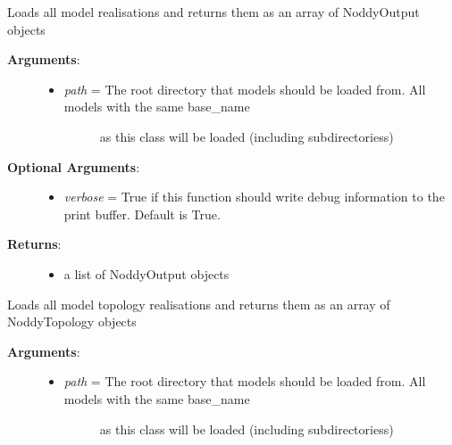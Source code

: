 \documentclass[a4paper,10pt,english]{sphinxmanual}
\begin{document}
\begin{fulllineitems}
\begin{fulllineitems}
\label{pynoddy:pynoddy.experiment.MonteCarlo.MonteCarlo.load_noddy_realisations}
Loads all model realisations and returns them as an array of NoddyOutput objects
\begin{description}
\item[{\textbf{Arguments}:}] \leavevmode\begin{itemize}
\item {} \begin{description}
\item[{\emph{path} = The root directory that models should be loaded from. All models with the same base\_name}] \leavevmode
as this class will be loaded (including subdirectoriess)

\end{description}

\end{itemize}

\item[{\textbf{Optional Arguments}:}] \leavevmode\begin{itemize}
\item {} 
\emph{verbose} = True if this function should write debug information to the print buffer. Default is True.

\end{itemize}

\item[{\textbf{Returns}:}] \leavevmode\begin{itemize}
\item {} 
a list of NoddyOutput objects

\end{itemize}

\end{description}

\end{fulllineitems}


\begin{fulllineitems}
\label{pynoddy:pynoddy.experiment.MonteCarlo.MonteCarlo.load_topology_realisations}
Loads all model topology realisations and returns them as an array of NoddyTopology objects
\begin{description}
\item[{\textbf{Arguments}:}] \leavevmode\begin{itemize}
\item {} \begin{description}
\item[{\emph{path} = The root directory that models should be loaded from. All models with the same base\_name}] \leavevmode
as this class will be loaded (including subdirectoriess)


\end{description}
\end{itemize}
\end{description}
\end{fulllineitems}
\end{fulllineitems}
\end{document}
